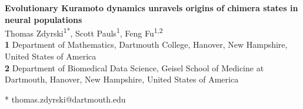 \documentclass[10pt,letterpaper]{article}
\begin{document}
\vspace*{0.2in}

\begin{flushleft}
{\Large
\textbf{Evolutionary Kuramoto dynamics unravels origins of chimera states
in neural populations}
}
\newline
\\
	Thomas Zdyrski\textsuperscript{1*},
	Scott Pauls\textsuperscript{1},
	Feng Fu\textsuperscript{1,2}
\\
\bigskip
\textbf{1} Department of Mathematics, Dartmouth College, Hanover, New Hampshire, United States of America
\\
\textbf{2} Department of Biomedical Data Science, Geisel School of Medicine at Dartmouth, Hanover, New Hampshire, United States of America
\\
\bigskip

* thomas.zdyrski@dartmouth.edu

\end{flushleft}

\end{document}
